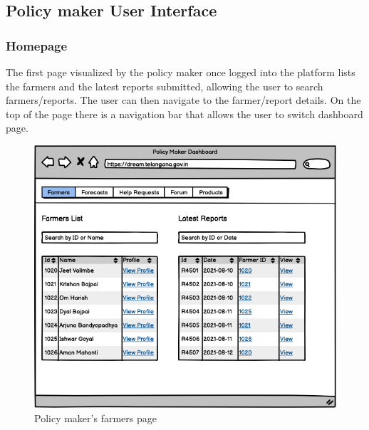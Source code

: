 \documentclass[10pt]{article} %
\begin{document}
\newpage
\subsection{Policy maker User Interface}
\subsubsection{Homepage}
The first page visualized by the policy maker once logged into the platform lists the farmers and the latest reports submitted, allowing the
user to search farmers/reports. The user can then navigate to the farmer/report details. On the top of the page there is a navigation bar that
allows the user to switch dashboard page.\\
\begin{figure}[h!]
    \centering
    \centerline{\includegraphics[scale=0.54]{images/uimockups/pm_farmers.png}}
    \caption{Policy maker's farmers page}
    \label{fig:ui_pm_farmers}
\end{figure}\
\newpage
\end{document}
